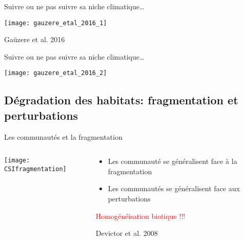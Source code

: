 \documentclass[10pt]{beamer}
\begin{document}
\begin{frame}{Suivre ou ne pas suivre sa niche climatique…}
  \begin{center}
   \texttt{[image: gauzere\_etal\_2016\_1]}

  \end{center}

  \begin{tiny}
    Gaüzere et al. 2016
  \end{tiny}
\end{frame}



\begin{frame}{Suivre ou ne pas suivre sa niche climatique…}
  \begin{center}

      \texttt{[image: gauzere\_etal\_2016\_2]}
  \end{center}


\end{frame}


\subsection{Dégradation des habitats: fragmentation et perturbations}

\begin{frame}{Les communautés et la fragmentation}
 \begin{columns}[c]
    \begin{column}[c]{0.4\textwidth}
      \begin{center}
     \texttt{[image: CSIfragmentation]}
      \end{center}
    \end{column}
    \begin{column}[c]{0.6\textwidth}
      \begin{itemize}[<+->]
      \item Les communauté se généralisent face à la fragmentation
      \item Les communautés se généralisent face aux perturbations
      \end{itemize}
       \begin{center}
   \textcolor{red}{Homogénéisation biotique !!!}
      \end{center}
        \begin{tiny}
    Devictor et al. 2008
  \end{tiny}
    \end{column}
  \end{columns}
\end{frame}
\end{document}
